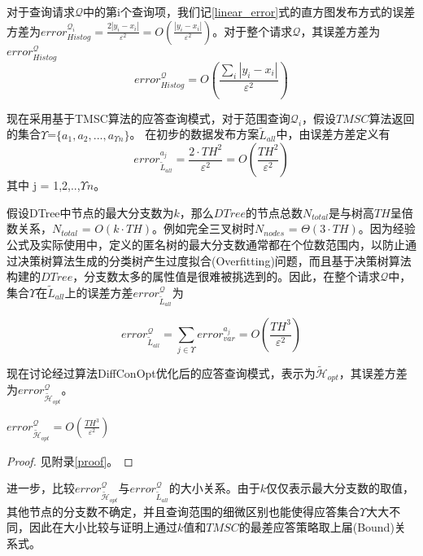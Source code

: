 对于查询请求$\mathcal{Q}$中的第i个查询项，我们记\ref{linear_error}式的直方图发布方式的误差方差为$error_{Histog}^{\mathcal{Q}_{i}} = \frac{2|y_{i}-x_{i}|}{\varepsilon^2} = O(\frac{|y_{i}-x_{i}|}{\varepsilon^2})$。对于整个请求$\mathcal{Q}$，其误差方差为$error_{Histog}^{\mathcal{Q}}$
\begin{equation}
\label{linear_error2}
error_{Histog}^{\mathcal{Q}} = O(\frac{\sum\limits_i |y_{i}-x_{i}|}{\varepsilon^2})
\end{equation}

现在采用基于TMSC算法的应答查询模式，对于范围查询$\mathcal{Q}_{i}$，假设$TMSC$算法返回的集合$\Upsilon$=$\{a_{1},a_{2},...,a_{\Upsilon n}\}$。
在初步的数据发布方案$\tilde{L}_{all}$中，由误差方差定义有
\[
	error_{\tilde{L}_{all}}^{a_{j}} = \frac{2 \cdotp TH^2}{\varepsilon^2} = O(\frac{TH^2}{\varepsilon^2})
\]
其中 j = 1,2,..,$\Upsilon n$。

假设DTree中节点的最大分支数为$k$，那么$DTree$的节点总数$N_{total}$是与树高$TH$呈倍数关系，$N_{total}$ = $O(k \cdotp TH)$。例如完全三叉树时$N_{nodes}$ = $\Theta(3 \cdotp TH)$。因为经验公式及实际使用中，定义的匿名树的最大分支数通常都在个位数范围内，以防止通过决策树算法生成的分类树产生过度拟合(Overfitting)\supercite{overfitting}问题，而且基于决策树算法构建的$DTree$，分支数太多的属性值是很难被挑选到的。因此，在整个请求$\mathcal{Q}$中，集合$\Upsilon$在$\tilde{L}_{all}$上的误差方差$error_{\tilde{L}_{all}}^{\mathcal{Q}}$为

\[
\label{Lall_error}
error_{\tilde{L}_{all}}^{\mathcal{Q}} = \sum\limits_{j \in \Upsilon} error_{var}^{a_{j}}=O(\frac{TH^3}{\varepsilon^2})
\]

现在讨论经过算法DiffConOpt优化后的应答查询模式，表示为$\tilde{\mathcal{H}}_{opt}$，其误差方差为$error_{\tilde{\mathcal{H}}_{opt}}^{\mathcal{Q}}$。

\begin{prop}
	\label{chap4_prop6}
	$error_{\tilde{\mathcal{H}}_{opt}}^{\mathcal{Q}} = O(\frac{TH^3}{\varepsilon^2})$
\end{prop}
\begin{proof}
	见附录\ref{proof}。
\end{proof}

进一步，比较$error_{\tilde{\mathcal{H}}_{opt}}^{\mathcal{Q}}$与$error_{\tilde{L}_{all}}^{\mathcal{Q}}$的大小关系。由于$k$仅仅表示最大分支数的取值，其他节点的分支数不确定，并且查询范围的细微区别也能使得应答集合$\Upsilon$大大不同，因此在大小比较与证明上通过$k$值和$TMSC$的最差应答策略取上届(Bound)关系式。

